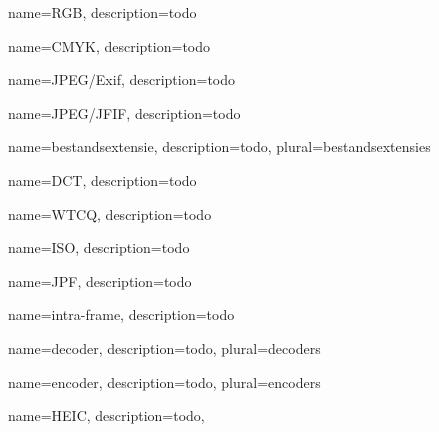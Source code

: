 {
	name={RGB},
	description={todo}
}

{
	name={CMYK},
	description={todo}
}

{
	name={JPEG/Exif},
	description={todo}
}

{
	name={JPEG/JFIF},
	description={todo}
}

{
	name={bestandsextensie},
	description={todo},
	plural={bestandsextensies}
}

{
	name={DCT},
	description={todo}
}

{
	name={WTCQ},
	description={todo}
}

{
	name={ISO},
	description={todo}
}

{
	name={JPF},
	description={todo}
}

{
	name={intra-frame},
	description={todo}
}

{
	name={decoder},
	description={todo},
	plural={decoders}
}

{
	name={encoder},
	description={todo},
	plural={encoders}
}

{
	name={HEIC},
	description={todo},
}
